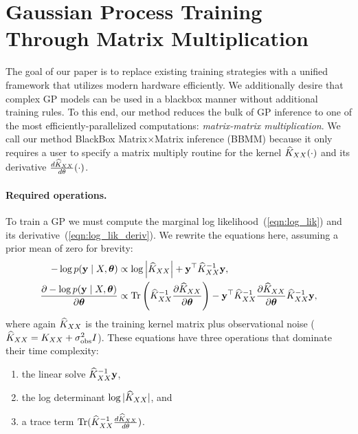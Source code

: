 \section{Gaussian Process Training Through Matrix Multiplication}

\label{sec:method}
The goal of our paper is to replace existing training strategies with a unified framework that utilizes modern hardware efficiently.
We additionally desire that complex GP models can be used in a blackbox manner without additional training rules.
To this end, our method reduces the bulk of GP inference to one of the most efficiently-parallelized computations: \emph{matrix-matrix multiplication}.
We call our method BlackBox Matrix$\times$Matrix inference (BBMM) because it only requires a user to specify a matrix multiply routine for the kernel $\widehat{K}_{XX} ( \cdot )$ and its derivative $\frac{d\widehat{K}_{XX}}{d\theta} ( \cdot )$.

\paragraph{Required operations.}
To train a GP we must compute the marginal log likelihood~(\cref{eqn:log_lik}) and its derivative~(\cref{eqn:log_lik_deriv}).
We rewrite the equations here, assuming a prior mean of zero for brevity:
\begin{align*}
  -\log p( \by \mid \bX, \btheta)
  &\propto \log \left \vert \trainK \right \vert + \by^{\top} \trainK^{-1} \by,
  \\
  \frac{\partial - \log p( \by \mid \bX, \btheta )}{\partial \btheta}
  &\propto
   \tr{\trainK^{-1}\frac{\partial \trainK}{\partial \btheta}} -
	\by^{\top} \trainK^{-1}\frac{\partial \trainK}{\partial \btheta}\trainK^{-1} \by,
\end{align*}
where again $\widehat{K}_{XX}$ is the training kernel matrix plus observational noise ($\widehat{K}_{XX} = K_{XX} + \sigma^2_\text{obs} I$).
These equations have three operations that dominate their time complexity:
\begin{enumerate}
  \item the linear solve $\widehat{K}_{XX}^{-1}\mathbf{y}$,
  \item the log determinant $\log \vert \widehat{K}_{XX} \vert$, and
  \item a trace term $\tr{\trainK^{-1}\frac{d\trainK}{d\theta}}$.
\end{enumerate}

